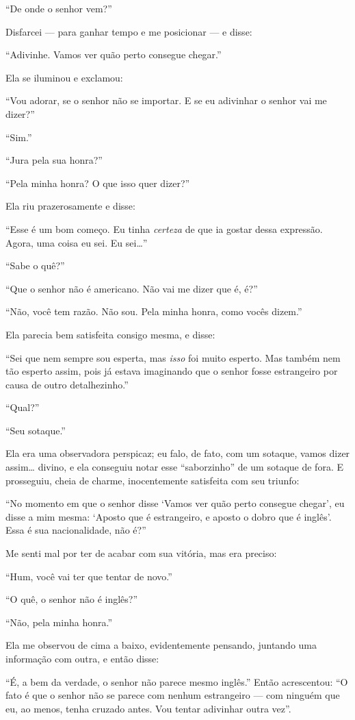 “De onde o senhor vem?”

Disfarcei --- para ganhar tempo e me posicionar --- e disse:

“Adivinhe. Vamos ver quão perto consegue chegar.”

Ela se iluminou e exclamou:

“Vou adorar, se o senhor não se importar. E se eu adivinhar
o senhor vai me dizer?”

“Sim.”

“Jura pela sua honra?”

“Pela minha honra? O que isso quer dizer?”

Ela riu prazerosamente e disse:

“Esse é um bom começo. Eu tinha \textit{certeza} de que ia gostar dessa expressão.
Agora, uma coisa eu sei. Eu sei\ldots{}”

“Sabe o quê?”

“Que o senhor não é americano. Não vai me dizer que é, é?”

“Não, você tem razão. Não sou. Pela minha honra, como vocês dizem.”

Ela parecia bem satisfeita consigo mesma, e disse:

“Sei que nem sempre sou esperta, mas \textit{isso} foi muito esperto. Mas também
nem tão esperto assim, pois já estava imaginando que o senhor fosse estrangeiro por
causa de outro detalhezinho.”

“Qual?”

“Seu sotaque.”

Ela era uma observadora perspicaz; eu falo, de fato, com um sotaque, vamos dizer
assim\ldots{} divino, e ela conseguiu notar esse “saborzinho” de um sotaque de fora. E
prosseguiu, cheia de charme, inocentemente satisfeita com seu triunfo:

“No momento em que o senhor disse ‘Vamos ver quão perto consegue chegar’, eu disse a mim mesma:
‘Aposto que é estrangeiro, e aposto o dobro que é inglês’. Essa é sua
nacionalidade, não é?”

Me senti mal por ter de acabar com sua vitória, mas era preciso:

“Hum, você vai ter que tentar de novo.”

“O quê, o senhor não é inglês?”

“Não, pela minha honra.”

Ela me observou de cima a baixo, evidentemente pensando, juntando
uma informação com outra, e então disse:

“É, a bem da verdade, o senhor não parece mesmo inglês.” Então acrescentou: “O fato
é que o senhor não se parece com nenhum estrangeiro --- com ninguém que eu, ao menos,
tenha cruzado antes. Vou tentar adivinhar outra vez”.

